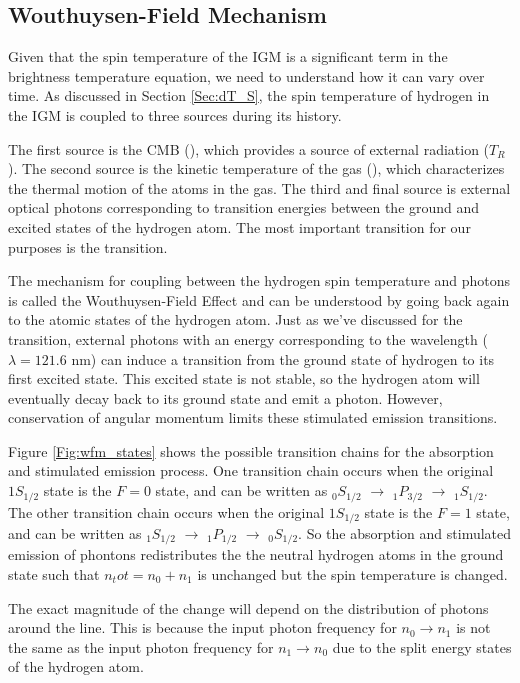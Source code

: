 \subsection{Wouthuysen-Field Mechanism}\label{Sec:WFM}
Given that the spin temperature of the IGM is a significant term in the brightness temperature equation, we need to understand how it can vary over time. As discussed in Section \ref{Sec:dT_S}, the spin temperature of hydrogen in the IGM is coupled to three sources during its history. 

The first source is the CMB (\tg), which provides a source of external radiation ($T_R$). The second source is the kinetic temperature of the gas (\tk), which characterizes the thermal motion of the atoms in the gas. The third and final source is external optical photons corresponding to transition energies between the ground and excited states of the hydrogen atom. The most important transition for our purposes is the \lya  transition. 

The mechanism for coupling between the hydrogen spin temperature and \lya  photons is called the Wouthuysen-Field Effect \cite{wouthuysen_1952}\cite{field_1958} and can be understood by going back again to the atomic states of the hydrogen atom. Just as we've discussed for the \cm transition, external photons with an energy corresponding to the \lya  wavelength ($\lambda = 121.6$ nm) can induce a transition from the ground state of hydrogen to its first excited state. This excited state is not stable, so the hydrogen atom will eventually decay back to its ground state and emit a photon. However, conservation of angular momentum limits these stimulated emission transitions. 

Figure \ref{Fig:wfm_states} shows the possible transition chains for the \lya absorption and stimulated emission process. One transition chain occurs when the original $1S_{1/2}$ state is the $F=0$ state, and can be written as $_0S_{1/2}$ $\rightarrow$ $_1P_{3/2}$ $\rightarrow$ $_1S_{1/2}$. The other transition chain occurs when the original $1S_{1/2}$ state is the $F=1$ state, and can be written as $_1S_{1/2}$ $\rightarrow$ $_1P_{1/2}$ $\rightarrow$ $_0S_{1/2}$. So the absorption and stimulated emission of \lya phontons redistributes the the neutral hydrogen atoms in the ground state such that $n_tot = n_0 + n_1$ is unchanged but the spin temperature is changed. 

The exact magnitude of the change will depend on the distribution of photons around the \lya  line. This is because the input photon frequency for $n_0 \rightarrow n_1$ is not the same as the input photon frequency for $n_1 \rightarrow n_0$ due to the split energy states of the hydrogen atom. 

